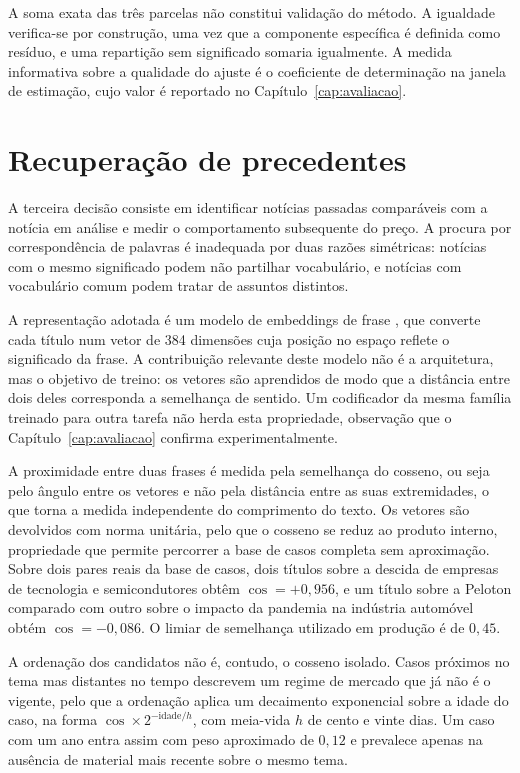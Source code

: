 A soma exata das três parcelas não constitui validação do método. A igualdade verifica-se por
construção, uma vez que a componente específica é definida como resíduo, e uma repartição sem
significado somaria igualmente. A medida informativa sobre a qualidade do ajuste é o coeficiente
de determinação na janela de estimação, cujo valor é reportado no Capítulo~\ref{cap:avaliacao}.

\section{Recuperação de precedentes}
\label{sec:met_recuperacao}

A terceira decisão consiste em identificar notícias passadas comparáveis com a notícia em análise
e medir o comportamento subsequente do preço. A procura por correspondência de palavras é
inadequada por duas razões simétricas: notícias com o mesmo significado podem não partilhar
vocabulário, e notícias com vocabulário comum podem tratar de assuntos distintos.

A representação adotada é um modelo de embeddings de frase \autocite{reimers2019sbert}, que
converte cada título num vetor de 384 dimensões cuja posição no espaço reflete o significado da
frase. A contribuição relevante deste modelo não é a arquitetura, mas o objetivo de treino: os
vetores são aprendidos de modo que a distância entre dois deles corresponda a semelhança de
sentido. Um codificador da mesma família treinado para outra tarefa não herda esta propriedade,
observação que o Capítulo~\ref{cap:avaliacao} confirma experimentalmente.

A proximidade entre duas frases é medida pela semelhança do cosseno, ou seja pelo ângulo entre os
vetores e não pela distância entre as suas extremidades, o que torna a medida independente do
comprimento do texto. Os vetores são devolvidos com norma unitária, pelo que o cosseno se reduz ao
produto interno, propriedade que permite percorrer a base de casos completa sem aproximação. Sobre
dois pares reais da base de casos, dois títulos sobre a descida de empresas de tecnologia e
semicondutores obtêm $\cos = +0{,}956$, e um título sobre a Peloton comparado com outro sobre o
impacto da pandemia na indústria automóvel obtém $\cos = -0{,}086$. O limiar de semelhança
utilizado em produção é de $0{,}45$.

A ordenação dos candidatos não é, contudo, o cosseno isolado. Casos próximos no tema mas distantes
no tempo descrevem um regime de mercado que já não é o vigente, pelo que a ordenação aplica um
decaimento exponencial sobre a idade do caso, na forma $\cos \times 2^{-\text{idade}/h}$, com
meia-vida $h$ de cento e vinte dias. Um caso com um ano entra assim com peso aproximado de $0{,}12$
e prevalece apenas na ausência de material mais recente sobre o mesmo tema.

